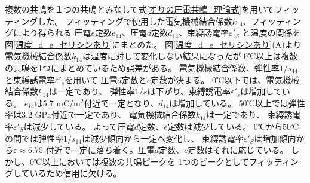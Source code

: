 \documentclass[dvipdfmx,12pt,a4paper]{jreport}
\begin{document}
			複数の共鳴を１つの共鳴とみなして式\eqref{ずりの圧電共鳴_理論式}を用いてフィッティングした。
			フィッティングで使用した電気機械結合係数$k_{14}$、フィッティングにより得られる
			圧電$e$定数$e_{14}$、圧電$d$定数$d_{14}$、束縛誘電率$\varepsilon'_{S}$
			と温度の関係を図\ref{温度_d_e_セリシンあり}にまとめた。
			図\ref{温度_d_e_セリシンあり}(A)より
			電気機械結合係数$k_{14}$は温度に対して変化しない結果になったが
			0℃以上は複数の共鳴を1つにまとめているため誤差がある。
			電気機械結合係数、弾性率$1/s_{44}$と束縛誘電率$\varepsilon'_s$を用いて
			圧電$d$定数と$e$定数が決まる。
			0℃以下では、電気機械結合係数$k_{14}$は一定であり、
			弾性率$1/s$は下がり、束縛誘電率$\varepsilon'_s$は増加している。
			$e_{14}$は5.7 mC/m$^2$付近で一定となり、$d_{14}$は増加している。
			50℃以上では弾性率は3.2 GPa付近で一定であり、
			電気機械結合係数$k_{14}$は一定であり、
			束縛誘電率$\varepsilon'_S$は減少している。
			よって圧電$d$定数、$e$定数は減少している。
			0℃から50℃の間では弾性率$1/s_{14}$は減少傾向から一定へ変化し、
			束縛誘電率$\varepsilon'_{S}$は増加傾向から$\varepsilon \approx 6.75$
			付近で一定に落ち着く。圧電$d$定数、$e$定数はそれに応じている。
			しかし、0℃以上においては複数の共鳴ピークを
			1つのピークとしてフィッティングしているため信用に欠ける。
			
\end{document}

